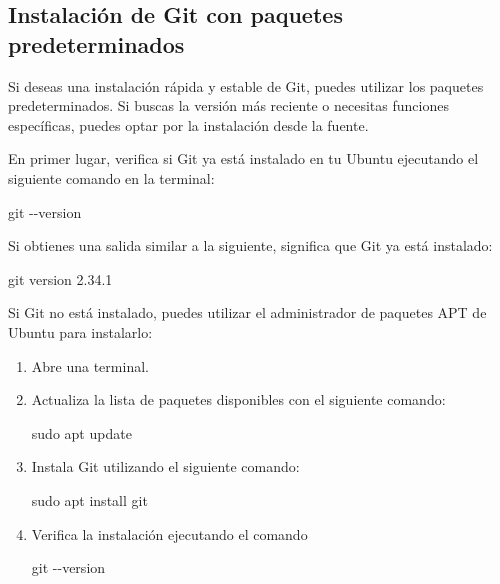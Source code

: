 \documentclass[
  letterpaper,
  DIV=11,
  numbers=noendperiod]{scrartcl}
\newenvironment{Shaded}{}{}
\newcommand{\AttributeTok}[1]{\textcolor[rgb]{0.84,0.23,0.29}{#1}}
\newcommand{\FunctionTok}[1]{\textcolor[rgb]{0.44,0.26,0.76}{#1}}
\newcommand{\NormalTok}[1]{\textcolor[rgb]{0.14,0.16,0.18}{#1}}
\begin{document}
\hypertarget{instalaciuxf3n-de-git-con-paquetes-predeterminados}{%
\subsection{Instalación de Git con paquetes
predeterminados}\label{instalaciuxf3n-de-git-con-paquetes-predeterminados}}

Si deseas una instalación rápida y estable de Git, puedes utilizar los
paquetes predeterminados. Si buscas la versión más reciente o necesitas
funciones específicas, puedes optar por la instalación desde la fuente.

En primer lugar, verifica si Git ya está instalado en tu Ubuntu
ejecutando el siguiente comando en la terminal:

\begin{Shaded}
\begin{Highlighting}[]
\FunctionTok{git} \AttributeTok{{-}{-}version}
\end{Highlighting}
\end{Shaded}

Si obtienes una salida similar a la siguiente, significa que Git ya está
instalado:

\begin{Shaded}
\begin{Highlighting}[]
\FunctionTok{git}\NormalTok{ version 2.34.1}
\end{Highlighting}
\end{Shaded}

Si Git no está instalado, puedes utilizar el administrador de paquetes
APT de Ubuntu para instalarlo:

\begin{enumerate}
\def\labelenumi{\arabic{enumi}.}
\item
  Abre una terminal.
\item
  Actualiza la lista de paquetes disponibles con el siguiente comando:

\begin{Shaded}
\begin{Highlighting}[]
\FunctionTok{sudo}\NormalTok{ apt update}
\end{Highlighting}
\end{Shaded}
\item
  Instala Git utilizando el siguiente comando:

\begin{Shaded}
\begin{Highlighting}[]
\FunctionTok{sudo}\NormalTok{ apt install git}
\end{Highlighting}
\end{Shaded}
\item
  Verifica la instalación ejecutando el comando

\begin{Shaded}
\begin{Highlighting}[]
\FunctionTok{git} \AttributeTok{{-}{-}version}
\end{Highlighting}
\end{Shaded}
\end{enumerate}
\end{document}
